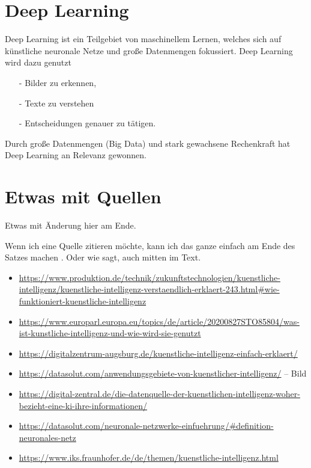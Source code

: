 \documentclass{report}
\begin{document}
 \section{Deep Learning} 
  Deep Learning ist ein Teilgebiet von maschinellem Lernen, 
  welches sich auf künstliche neuronale Netze und große Datenmengen fokussiert. Deep Learning wird dazu genutzt
  \begin{itemize}
    \item[-] Bilder zu erkennen,
    \item[-]Texte zu verstehen
    \item[-]Entscheidungen genauer zu tätigen.
    
    \end{itemize}
  Durch große Datenmengen (Big Data) und stark gewachsene Rechenkraft hat Deep Learning an Relevanz gewonnen.









\section{Etwas mit Quellen}

Etwas mit Änderung hier am Ende.

Wenn ich eine Quelle zitieren möchte, kann ich das ganze einfach am Ende des Satzes machen \citep{example}. Oder wie \citet{example} sagt, auch mitten im Text.


\begin{itemize}
\item \url{https://www.produktion.de/technik/zukunftstechnologien/kuenstliche-intelligenz/kuenstliche-intelligenz-verstaendlich-erklaert-243.html#wie-funktioniert-kuenstliche-intelligenz}
\item \url{https://www.europarl.europa.eu/topics/de/article/20200827STO85804/was-ist-kunstliche-intelligenz-und-wie-wird-sie-genutzt}
\item \url{https://digitalzentrum-augsburg.de/kuenstliche-intelligenz-einfach-erklaert/}
\item \url{https://datasolut.com/anwendungsgebiete-von-kuenstlicher-intelligenz/} -- Bild
\item \url{https://digital-zentral.de/die-datenquelle-der-kuenstlichen-intelligenz-woher-bezieht-eine-ki-ihre-informationen/}
\item \url{https://datasolut.com/neuronale-netzwerke-einfuehrung/#definition-neuronales-netz}
\item \url{https://www.iks.fraunhofer.de/de/themen/kuenstliche-intelligenz.html}
\end{itemize}

\printbibliography
\end{document}
